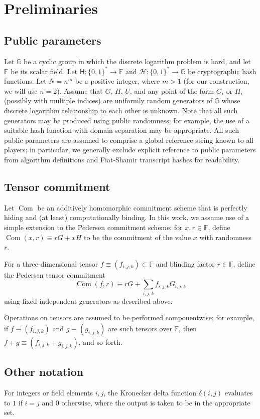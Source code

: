 \documentclass{article}
\newcommand{\G}{\mathbb{G}}
\newcommand{\F}{\mathbb{F}}
\newcommand{\hs}{\mathsf{H}}
\newcommand{\hp}{\mathcal{H}}
\newcommand{\com}{\operatorname{Com}}
\theoremstyle{definition}
\begin{document}
\section{Preliminaries}
\subsection{Public parameters}
Let $\G$ be a cyclic group in which the discrete logarithm problem is hard, and let $\F$ be its scalar field.
Let $\hs: \{0,1\}^* \to \F$ and $\hp: \{0,1\}^* \to \G$ be cryptographic hash functions.
Let $N = n^m$ be a positive integer, where $m > 1$ (for our construction, we will use $n = 2$).
Assume that $G$, $H$, $U$, and any point of the form $G_i$ or $H_i$ (possibly with multiple indices) are uniformly random generators of $\G$ whose discrete logarithm relationship to each other is unknown.
Note that all such generators may be produced using public randomness; for example, the use of a suitable hash function with domain separation may be appropriate.
All such public parameters are assumed to comprise a global reference string known to all players; in particular, we generally exclude explicit reference to public parameters from algorithm definitions and Fiat-Shamir transcript hashes for readability.


\subsection{Tensor commitment}
Let $\com$ be an additively homomorphic commitment scheme that is perfectly hiding and (at least) computationally binding.
In this work, we assume use of a simple extension to the Pedersen commitment scheme: for $x,r \in \F$, define $\com(x,r) \equiv rG + xH$ to be the commitment of the value $x$ with randomness $r$.

For a three-dimensional tensor $f \equiv (f_{i,j,k}) \subset \F$ and blinding factor $r \in \F$, define the Pedersen tensor commitment
$$\com(f,r) \equiv rG + \sum_{i,j,k} f_{i,j,k} G_{i,j,k}$$
using fixed independent generators as described above.

Operations on tensors are assumed to be performed componentwise; for example, if $f \equiv (f_{i,j,k})$ and $g \equiv (g_{i,j,k})$ are such tensors over $\F$, then $f + g \equiv (f_{i,j,k} + g_{i,j,k})$, and so forth.


\subsection{Other notation}
For integers or field elements $i,j$, the Kronecker delta function $\delta(i,j)$ evaluates to $1$ if $i=j$ and $0$ otherwise, where the output is taken to be in the appropriate set.
\end{document}
